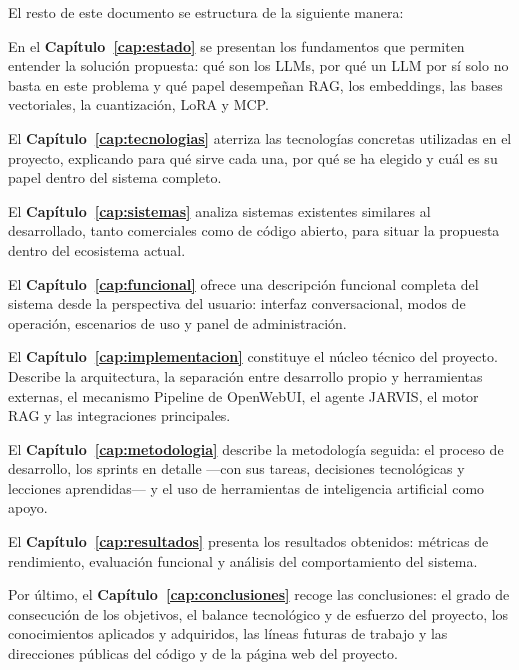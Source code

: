 El resto de este documento se estructura de la siguiente manera:

En el \textbf{Capítulo~\ref{cap:estado}} se presentan los fundamentos que permiten entender la solución propuesta: qué son los LLMs, por qué un LLM por sí solo no basta en este problema y qué papel desempeñan RAG, los embeddings, las bases vectoriales, la cuantización, LoRA y MCP.

El \textbf{Capítulo~\ref{cap:tecnologias}} aterriza las tecnologías concretas utilizadas en el proyecto, explicando para qué sirve cada una, por qué se ha elegido y cuál es su papel dentro del sistema completo.

El \textbf{Capítulo~\ref{cap:sistemas}} analiza sistemas existentes similares al desarrollado, tanto comerciales como de código abierto, para situar la propuesta dentro del ecosistema actual.

El \textbf{Capítulo~\ref{cap:funcional}} ofrece una descripción funcional completa del sistema desde la perspectiva del usuario: interfaz conversacional, modos de operación, escenarios de uso y panel de administración.

El \textbf{Capítulo~\ref{cap:implementacion}} constituye el núcleo técnico del proyecto. Describe la arquitectura, la separación entre desarrollo propio y herramientas externas, el mecanismo Pipeline de OpenWebUI, el agente JARVIS, el motor RAG y las integraciones principales.

El \textbf{Capítulo~\ref{cap:metodologia}} describe la metodología seguida: el proceso de desarrollo, los sprints en detalle ---con sus tareas, decisiones tecnológicas y lecciones aprendidas--- y el uso de herramientas de inteligencia artificial como apoyo.

El \textbf{Capítulo~\ref{cap:resultados}} presenta los resultados obtenidos: métricas de rendimiento, evaluación funcional y análisis del comportamiento del sistema.

Por último, el \textbf{Capítulo~\ref{cap:conclusiones}} recoge las conclusiones: el grado de consecución de los objetivos, el balance tecnológico y de esfuerzo del proyecto, los conocimientos aplicados y adquiridos, las líneas futuras de trabajo y las direcciones públicas del código y de la página web del proyecto.
